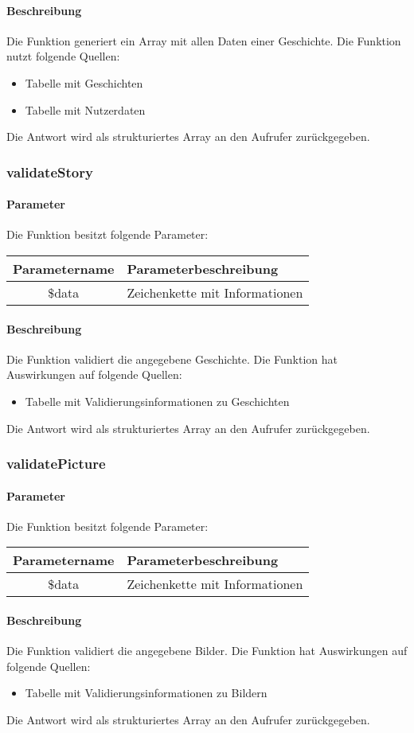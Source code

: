 \paragraph{Beschreibung} Die Funktion generiert ein Array mit allen Daten einer Geschichte. Die Funktion nutzt folgende Quellen:
\begin{itemize}
	\item Tabelle mit Geschichten
	\item Tabelle mit Nutzerdaten
\end{itemize}
Die Antwort wird als strukturiertes Array an den Aufrufer zurückgegeben.
\subsubsection{validateStory}
\paragraph{Parameter} Die Funktion besitzt folgende Parameter:
\begin{table}[H]
	\begin{tabular}{|c|p{11cm}|}
		\hline
		\textbf{Parametername} & \textbf{Parameterbeschreibung} \\ \hline
		\$data & Zeichenkette mit Informationen \\ \hline
	\end{tabular}
\end{table}
\paragraph{Beschreibung} Die Funktion validiert die angegebene Geschichte. Die Funktion hat Auswirkungen auf folgende Quellen:
\begin{itemize}
	\item Tabelle mit Validierungsinformationen zu Geschichten
\end{itemize}
Die Antwort wird als strukturiertes Array an den Aufrufer zurückgegeben.
\subsubsection{validatePicture}
\paragraph{Parameter} Die Funktion besitzt folgende Parameter:
\begin{table}[H]
	\begin{tabular}{|c|p{11cm}|}
		\hline
		\textbf{Parametername} & \textbf{Parameterbeschreibung} \\ \hline
		\$data & Zeichenkette mit Informationen \\ \hline
	\end{tabular}
\end{table}
\paragraph{Beschreibung} Die Funktion validiert die angegebene Bilder. Die Funktion hat Auswirkungen auf folgende Quellen:
\begin{itemize}
	\item Tabelle mit Validierungsinformationen zu Bildern
\end{itemize}
Die Antwort wird als strukturiertes Array an den Aufrufer zurückgegeben.